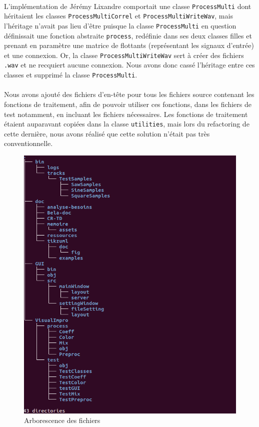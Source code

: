 \paragraph{}
L'implémentation de Jérémy Lixandre comportait une classe
\verb!ProcessMulti! dont héritaient les classes
\verb!ProcessMultiCorrel! et \verb!ProcessMultiWriteWav!, mais
l'héritage n'avait pas lieu d'être puisque la classe
\verb!ProcessMulti! en question définissait une fonction abstraite
\verb!process!, redéfinie dans ses deux classes filles et prenant en
paramètre une matrice de flottants (représentant les signaux d'entrée)
et une connexion. Or, la classe \verb!ProcessMultiWriteWav! sert à
créer des fichiers \verb!.wav! et ne recquiert aucune connexion. Nous
avons donc cassé l'héritage entre ces classes et supprimé la classe
\verb!ProcessMulti!.

\paragraph{}
Nous avons ajouté des fichiers d'en-tête pour tous les fichiers source
contenant les fonctions de traitement, afin de pouvoir utiliser ces
fonctions, dans les fichiers de test notamment, en incluant les fichiers
nécessaires. Les fonctions de traitement étaient auparavant copiées
dans la classe \verb!utilities!, mais lors du refactoring de cette
dernière, nous avons réalisé que cette solution n'était pas très
conventionnelle.

\begin{figure}[H]
 \centering
 \includegraphics[scale=0.5]{assets/tree.png}
 \caption{Arborescence des fichiers}
 \label{schéma global}
\end{figure}

